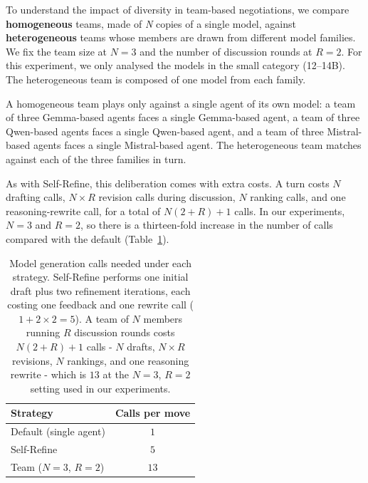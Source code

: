 To understand the impact of diversity in team-based negotiations, we compare \textbf{homogeneous} teams, made of \textit{N} copies of a single model, against \textbf{heterogeneous} teams whose members are drawn from different model families. We fix the team size at $N = 3$ and the number of discussion rounds at $R = 2$. For this experiment, we only analysed the models in the small category (12--14B). The heterogeneous team is composed of one model from each family.

A homogeneous team plays only against a single agent of its own model: a team of three Gemma-based agents faces a single Gemma-based agent, a team of three Qwen-based agents faces a single Qwen-based agent, and a team of three Mistral-based agents faces a single Mistral-based agent. The heterogeneous team matches against each of the three families in turn.

As with Self-Refine, this deliberation comes with extra costs. A turn costs $N$ drafting calls, $N \times R$ revision calls during discussion, $N$ ranking calls, and one reasoning-rewrite call, for a total of $N(2+R)+1$ calls. In our experiments, $N = 3$ and $R = 2$, so there is a thirteen-fold increase in the number of calls compared with the default (Table~\ref{tab:inference-cost}). 


\begin{table}
\centering
\small
\caption{Model generation calls needed under each strategy. Self-Refine performs one initial draft plus two refinement iterations, each costing one feedback and one rewrite call ($1+2\times2=5$). A team of $N$ members running $R$ discussion rounds costs $N(2+R)+1$ calls - $N$ drafts, $N\times R$ revisions, $N$ rankings, and one reasoning rewrite - which is $13$ at the $N=3$, $R=2$ setting used in our experiments.}
\label{tab:inference-cost}
\begin{tabular}{lc}
\toprule
\textbf{Strategy} & \textbf{Calls per move} \\
\midrule
Default (single agent)         & $1$ \\
Self-Refine                    & $5$ \\
Team ($N{=}3$, $R{=}2$)        & $13$ \\
\bottomrule
\end{tabular}
\end{table}
